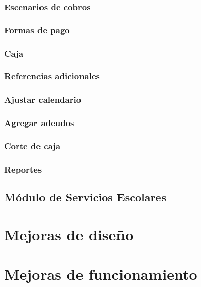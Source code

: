 \documentclass[12pt,spanish,twocolumn]{article}
\begin{document}
\subsubsection{Escenarios de cobros}

\subsubsection{Formas de pago}

\subsubsection{Caja}

\subsubsection{Referencias adicionales}

\subsubsection{Ajustar calendario}

\subsubsection{Agregar adeudos}

\subsubsection{Corte de caja}

\subsubsection{Reportes}

\subsection{M\'odulo de Servicios Escolares}

\section{Mejoras de dise\~no}

\section{Mejoras de funcionamiento}
\end{document}
